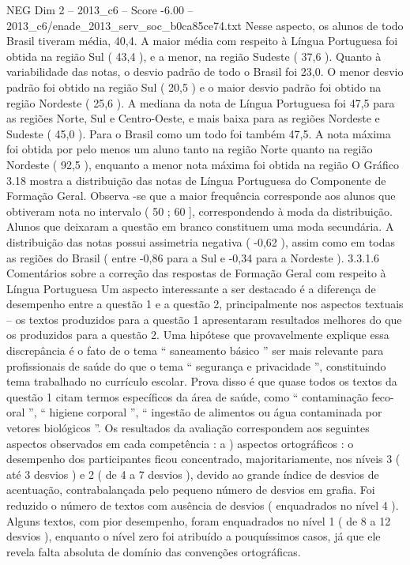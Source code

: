 \begin{textsample}{NEG Dim 2 – 2013\_c6 – Score -6.00 – 2013\_c6/enade\_2013\_serv\_soc\_b0ca85ce74.txt}
Nesse aspecto, os alunos de todo Brasil tiveram média, 40,4.
A maior média com respeito à Língua Portuguesa foi obtida na região Sul ( 43,4 ), e a menor, na região Sudeste ( 37,6 ).
Quanto à variabilidade das notas, o desvio padrão de todo o Brasil foi 23,0.
O menor desvio padrão foi obtido na região Sul ( 20,5 ) e o maior desvio padrão foi obtido na região Nordeste ( 25,6 ).
A mediana da nota de Língua Portuguesa foi 47,5 para as regiões Norte, Sul e Centro-Oeste, e mais baixa para as regiões Nordeste e Sudeste ( 45,0 ).
Para o Brasil como um todo foi também 47,5.
A nota máxima foi obtida por pelo menos um aluno tanto na região Norte quanto na região Nordeste ( 92,5 ), enquanto a menor nota máxima foi obtida na região O Gráfico 3.18 mostra a distribuição das notas de Língua Portuguesa do Componente de Formação Geral.
Observa -se que a maior frequência corresponde aos alunos que obtiveram nota no intervalo ( 50 ; 60 ], correspondendo à moda da distribuição.
Alunos que deixaram a questão em branco constituem uma moda secundária.
A distribuição das notas possui assimetria negativa ( -0,62 ), assim como em todas as regiões do Brasil ( entre -0,86 para a Sul e -0,34 para a Nordeste ). 3.3.1.6 Comentários sobre a correção das respostas de Formação Geral com respeito à Língua Portuguesa Um aspecto interessante a ser destacado é a diferença de desempenho entre a questão 1 e a questão 2, principalmente nos aspectos textuais – os textos produzidos para a questão 1 apresentaram resultados melhores do que os produzidos para a questão 2.
Uma hipótese que provavelmente explique essa discrepância é o fato de o tema “ saneamento básico ” ser mais relevante para profissionais de saúde do que o tema “ segurança e privacidade ”, constituindo tema trabalhado no currículo escolar.
Prova disso é que quase todos os textos da questão 1 citam termos específicos da área de saúde, como “ contaminação feco-oral ”, “ higiene corporal ”, “ ingestão de alimentos ou água contaminada por vetores biológicos ”.
Os resultados da avaliação correspondem aos seguintes aspectos observados em cada competência : a ) aspectos ortográficos : o desempenho dos participantes ficou concentrado, majoritariamente, nos níveis 3 ( até 3 desvios ) e 2 ( de 4 a 7 desvios ), devido ao grande índice de desvios de acentuação, contrabalançada pelo pequeno número de desvios em grafia.
Foi reduzido o número de textos com ausência de desvios ( enquadrados no nível 4 ).
Alguns textos, com pior desempenho, foram enquadrados no nível 1 ( de 8 a 12 desvios ), enquanto o nível zero foi atribuído a pouquíssimos casos, já que ele revela falta absoluta de domínio das convenções ortográficas.

\end{textsample}
